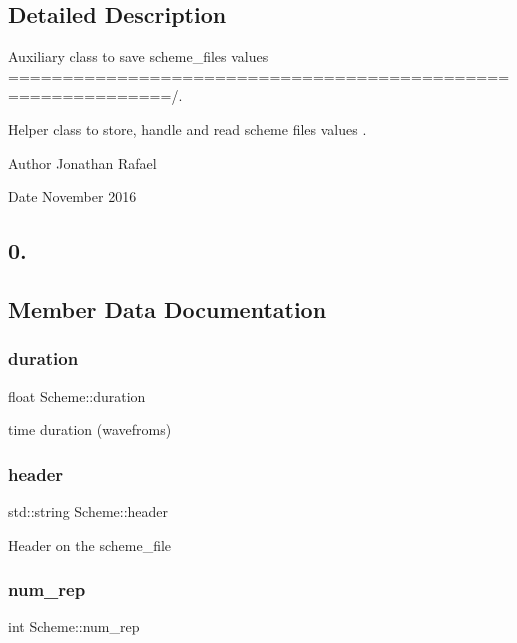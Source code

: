 \subsection{Detailed Description}
Auxiliary class to save scheme\+\_\+files values =============================================================/. 

Helper class to store, handle and read scheme files values . \begin{DoxyAuthor}{Author}
Jonathan Rafael 
\end{DoxyAuthor}
\begin{DoxyDate}{Date}
November 2016 \subsection*{0. }
\end{DoxyDate}


\subsection{Member Data Documentation}
\mbox{\label{class_scheme_ae2b4a7f1d0f06f4bea2a7f2761cbe2a7}} 
\subsubsection{\texorpdfstring{duration}{duration}}
{\footnotesize\ttfamily float Scheme\+::duration}

time duration (wavefroms) \mbox{\label{class_scheme_a276a907de6afa60b6826552f337e310b}} 
\subsubsection{\texorpdfstring{header}{header}}
{\footnotesize\ttfamily std\+::string Scheme\+::header}

Header on the scheme\+\_\+file \mbox{\label{class_scheme_ae41c5ea2b3aab4492f95b2479945b729}} 
\subsubsection{\texorpdfstring{num\+\_\+rep}{num\_rep}}
{\footnotesize\ttfamily int Scheme\+::num\+\_\+rep}

